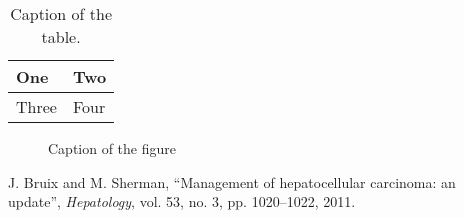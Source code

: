 \documentclass[twoside,twocolumn]{article}
\makeatletter
\def\subparagraph{\@startsection{paragraph}{5}{2\parindent}{0ex plus 0.1ex minus 0.1ex}%
{0ex}{\normalfont\small\itshape}}%
\makeatother
\begin{document}


\begin{table}[!htbp]
\caption{\label{tbl1}Caption of the table.}
\centering 
\def\arraystretch{1.15} %
\begin{tabular}{ll}
\hline
One & Two \\
\hline
Three & Four\\
\hline
\end{tabular} 
\end{table}

\begin{figure}[!htbp]
\centering 
\caption{\label{fig1}Caption of the figure}
\end{figure}



  
  
  \begin{thebibliography}{00}
		J. Bruix and M. Sherman, ``Management of hepatocellular carcinoma: 
		an update'', \textit{Hepatology}, vol. 53, no. 3, pp. 1020--1022, 2011.
 

 
 \end{thebibliography}  
\end{document}
